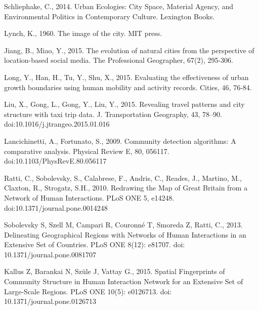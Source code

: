 \documentclass[10pt,letterpaper]{article}
\begin{document}
%
%
% 
\begin{thebibliography}{10}
Schliephake, C., 2014. Urban Ecologies: City Space, Material Agency, and Environmental Politics in Contemporary Culture. Lexington Books.

Lynch, K., 1960. The image of the city. MIT press.

Jiang, B., Miao, Y., 2015. The evolution of natural cities from the perspective of location-based social media. The Professional Geographer, 67(2), 295-306.

Long, Y., Han, H., Tu, Y., Shu, X., 2015. Evaluating the effectiveness of urban growth boundaries using human mobility and activity records. Cities, 46, 76-84.

Liu, X., Gong, L., Gong, Y., Liu, Y., 2015. Revealing travel patterns and city structure with taxi trip data. J. Transportation Geography, 43, 78–90. doi:10.1016/j.jtrangeo.2015.01.016

Lancichinetti, A., Fortunato, S., 2009. Community detection algorithms: A comparative analysis. Physical Review E, 80, 056117. doi:10.1103/PhysRevE.80.056117

Ratti, C., Sobolevsky, S., Calabrese, F., Andris, C., Reades, J., Martino, M., Claxton, R., Strogatz, S.H., 2010. Redrawing the Map of Great Britain from a Network of Human Interactions. PLoS ONE 5, e14248. doi:10.1371/journal.pone.0014248

Sobolevsky S, Szell M, Campari R, Couronné T, Smoreda Z, Ratti, C., 2013. Delineating Geographical Regions with Networks of Human Interactions in an Extensive Set of Countries. PLoS ONE 8(12): e81707. doi: 10.1371/journal.pone.0081707

Kallus Z, Barankai N, Szüle J, Vattay G., 2015. Spatial Fingerprints of Community Structure in Human Interaction Network for an Extensive Set of Large-Scale Regions. PLoS ONE 10(5): e0126713. doi: 10.1371/journal.pone.0126713 


\end{thebibliography}
\end{document}

